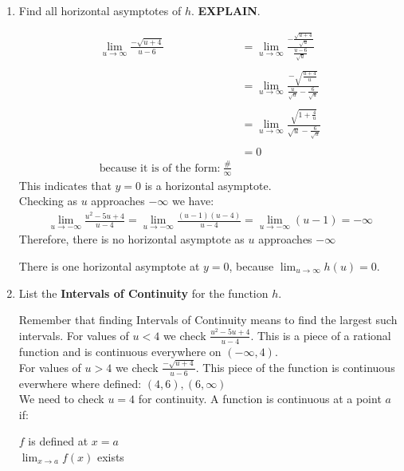 \documentclass{ximera}
\begin{document}
\begin{problem}
\begin{enumerate}
	\item Find all horizontal asymptotes of $h$. \textbf{EXPLAIN}.
\begin{explanation}
	\begin{align*}
	\lim_{u \to \infty}\frac{-\sqrt{u+4}}{u - 6}&=\lim_{u \to \infty}\frac{-\frac{\sqrt{u+4}}{\sqrt{u}}}{\frac{u - 6}{\sqrt{u}}}\\ \\
	&=\lim_{u \to \infty}\frac{-\sqrt{\frac{u+4}{u}}}{\frac{u}{\sqrt{u}} - \frac{6}{\sqrt{u}}}\\ \\
	&=\lim_{u \to \infty}\frac{\sqrt{1+\frac{4}{u}}}{\sqrt{u} - \frac{6}{\sqrt{u}}}\\ \\
	&=0\\ \text{because it is of the form:}\ \frac{\#}{\infty}
	\end{align*}
	This indicates that $y=0$ is a horizontal asymptote.\\
	Checking as $u$ approaches $-\infty$ we have:
	\begin{align*}
	\lim_{u \to -\infty}\frac{u^2-5u+4}{u - 4}=\lim_{u \to -\infty} \frac{(u-1)(u-4)}{u - 4}=\lim_{u \to -\infty} (u-1)= -\infty
	\end{align*}
 Therefore, there is no horizontal asymptote as $u$ approaches $-\infty$
	
	There is one horizontal asymptote at $y=0$, because $\displaystyle \lim_{u \to \infty}h(u)=0$.
	\end{explanation}

	\item List the \textbf{Intervals of Continuity} for the function $h$.
\begin{explanation}
		Remember that finding Intervals of Continuity means to find the largest such intervals.
		For values of $u<4$ we check $\frac{u^2-5u+4}{u - 4}$.  This is a piece of a rational function and  is continuous everywhere on $(-\infty,4)$. \\
	For values of $u>4$ we check $\frac{-\sqrt{u+4}}{u - 6}$. This piece of the function is continuous everwhere where defined: $(4,6),(6,\infty)$\\

	We need to check $u=4$ for continuity. A function is continuous at a point $a$ if:
	\begin{center}
	  $f$ is defined at $x = a$\\

     	 $\lim_{x \to a} f(x)$ exists\\


\end{center}
\end{explanation}
\end{enumerate}
\end{problem}
\end{document}
